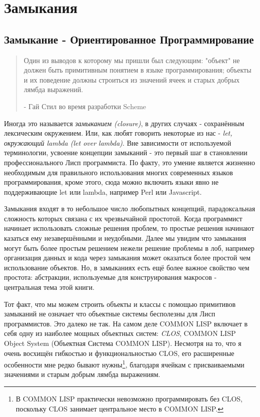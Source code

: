 \chapter{Замыкания}\label{chapter_closures}
\section{Замыкание - Ориентированное Программирование}\label{section_closure-oriented_programming}
\begin{quote}
Один из выводов к которому мы пришли был следующим: "объект" не должен быть примитивным понятием в языке программирования; объекты и их поведение должны строиться из значений ячеек и старых добрых лямбда выражений.

- Гай Стил во время разработки Scheme
\end{quote}

Иногда это называется \emph{замыканием (closure)}, в других случаях - сохранённым лексическим окружением. Или, как любят говорить некоторые из нас - \emph{let, окружающий lambda (let over lambda)}. Вне зависимости от используемой терминологии, усвоение концепции замыканий - это первый шаг в становлении профессионального Лисп программиста. По факту, это умение является жизненно необходимым для правильного использования многих современных языков программирования, кроме этого, сюда можно включить языки явно не поддерживающие let или lambda, например Perl или Javascript.

Замыкания входят в то небольшое число любопытных концепций, парадоксальная сложность которых связана с их чрезвычайной простотой. Когда программист начинает использовать сложные решения проблем, то простые решения начинают казаться ему незавершёнными и неудобными. Далее мы увидим что замыкания могут быть более простым решением нежели решение проблемы в лоб, например организация данных и кода через замыкания может оказаться более простой чем использование объектов. Но, в замыканиях есть ещё более важное свойство чем простота: абстракции, используемые для конструирования макросов - центральная тема этой книги.

Тот факт, что мы можем строить объекты и классы с помощью примитивов замыканий не означает что объектные системы бесполезны для Лисп программистов. Это далеко не так. На самом деле COMMON LISP включает в себя одну из наиболее мощных объектных систем: \emph{CLOS}, COMMON LISP Object System (Объектная Система COMMON LISP). Несмотря на то, что я очень восхищён гибкостью и функциональностью CLOS, его расширенные особенности мне редко бывают нужны\footnote{В COMMON LISP практически невозможно программировать без CLOS, поскольку CLOS занимает центральное место в COMMON LISP.}, благодаря ячейкам с присваиваемыми значениями и старым добрым лямбда выражениям.

